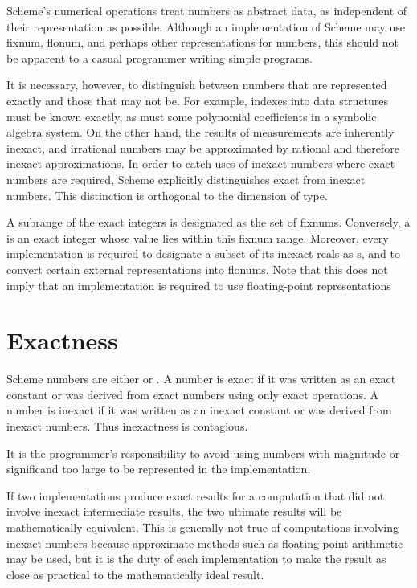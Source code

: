 Scheme's numerical operations treat numbers as abstract data, as
independent of their representation as possible.  Although an implementation
of Scheme may use fixnum, flonum, and perhaps other representations for
numbers, this should not be apparent to a casual programmer writing
simple programs.

It is necessary, however, to distinguish between numbers that are
represented exactly and those that may not be.  For example, indexes
into data structures must be known exactly, as must some polynomial
coefficients in a symbolic algebra system.  On the other hand, the
results of measurements are inherently inexact, and irrational numbers
may be approximated by rational and therefore inexact approximations.
In order to catch uses of inexact numbers where exact numbers are
required, Scheme explicitly distinguishes exact from inexact numbers.
This distinction is orthogonal to the dimension of type.

A subrange of the exact integers is designated as the set of fixnums.
Conversely, a  is an exact integer whose value lies
within this fixnum range.  Moreover, every implementation is required
to designate a subset of its inexact reals as s, and
to convert certain external representations into flonums.  Note that
this does not imply that an implementation is required to use
floating-point representations

\section{Exactness}
\label{exactly}

 Scheme numbers are either  or
.  A number is exact if it was written as an exact
constant or was derived from exact numbers using only exact
operations.  A number is inexact if it was written as an inexact
constant or was derived from inexact numbers.  Thus inexactness is
contagious.  

It is the programmer's responsibility to avoid using numbers with
magnitude or significand too large to be represented in the
implementation.

If two implementations produce exact results for a computation that
did not involve inexact intermediate results, the two ultimate results
will be mathematically equivalent.  This is generally not true of
computations involving inexact numbers because approximate methods
such as floating point arithmetic may be used, but it is the duty of
each implementation to make the result as close as practical to the
mathematically ideal result.


